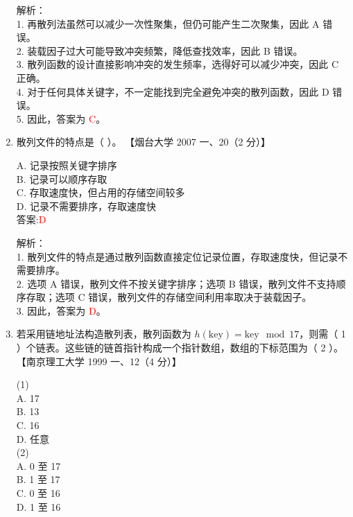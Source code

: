 \documentclass[lang=cn,newtx,10pt,scheme=chinese]{../../../elegantbook}
\begin{document}
\begin{enumerate}
    解析：\\
    1. 再散列法虽然可以减少一次性聚集，但仍可能产生二次聚集，因此 A 错误。\\
    2. 装载因子过大可能导致冲突频繁，降低查找效率，因此 B 错误。\\
    3. 散列函数的设计直接影响冲突的发生频率，选得好可以减少冲突，因此 C 正确。\\
    4. 对于任何具体关键字，不一定能找到完全避免冲突的散列函数，因此 D 错误。\\
    5. 因此，答案为 \textcolor{red}{C}。\\

\item 散列文件的特点是（ ）。  
    【烟台大学 2007 一、20（2 分）】  

    A. 记录按照关键字排序 \\  
    B. 记录可以顺序存取 \\  
    C. 存取速度快，但占用的存储空间较多 \\  
    D. 记录不需要排序，存取速度快 \\  

    答案:\textcolor{red}{D}

    解析：\\
    1. 散列文件的特点是通过散列函数直接定位记录位置，存取速度快，但记录不需要排序。\\
    2. 选项 A 错误，散列文件不按关键字排序；选项 B 错误，散列文件不支持顺序存取；选项 C 错误，散列文件的存储空间利用率取决于装载因子。\\
    3. 因此，答案为 \textcolor{red}{D}。\\

\item 若采用链地址法构造散列表，散列函数为 $h(\text{key}) = \text{key} \mod 17$，则需（ 1 ）个链表。这些链的链首指针构成一个指针数组，数组的下标范围为（ 2 ）。  
    【南京理工大学 1999 一、12（4 分）】  

    (1) \\  
    A. 17 \\  
    B. 13 \\  
    C. 16 \\  
    D. 任意 \\  

    (2) \\  
    A. 0 至 17 \\  
    B. 1 至 17 \\  
    C. 0 至 16 \\  
    D. 1 至 16 \\  


\end{enumerate}
\end{document}
